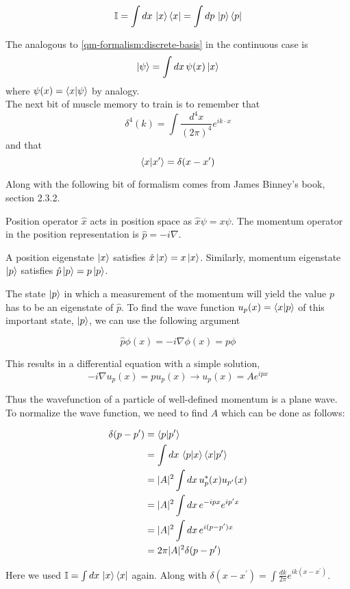 $$
\mathbb{I} = \int dx \, \ket{x} \bra{x} = \int dp \, \ket{p} \bra{p}
$$


The analogous to \ref{qm-formalism:discrete-basis} in the continuous case is
$$
\ket{\psi} = \int dx\, \psi(x) \ket{x}
$$
where $\psi (x) = \braket{x | \psi}$ by analogy.
\\


The next bit of muscle memory to train is to remember that
$$
\delta^{4} (k) = \int \frac{d^4x}{(2\pi)^4} e^{ik\cdot x}
$$
and that
$$
\braket{x | x^\prime} = \delta(x - x^\prime)
$$

Along with the following bit of formalism comes from James Binney's book, section 2.3.2.

Position operator $\hat{x}$ acts in position space as $\hat{x} \psi = x\psi$.
The momentum operator in the position representation is $\hat{p} = -i\nabla$.

A position eigenstate $\ket{x}$ satisfies $\hat{x}\ket{x} = x\ket{x}$.
Similarly, momentum eigenstate $\ket{p}$ satisfies $\hat{p}\ket{p} = p\ket{p}$.

The state $\ket{p}$ in which a measurement of the momentum will yield the value $p$ has to be an eigenstate
of $\hat{p}$.
To find the wave function $u_p (x) = \braket{x | p}$ of this important state, $\ket{p}$,
we can use the following argument

$$
\hat{p} \phi(x) = -i\nabla \phi(x) = p\phi
$$

This results in a differential equation with a simple solution,
$$
-i\nabla u_p(x) = p u_p(x) \rightarrow u_p(x) = Ae^{ipx}
$$

Thus the wavefunction of a particle of well-defined momentum is a plane wave.
To normalize the wave function, we need to find $A$ which can be done as follows:

\begin{align*}
\delta(p - p^\prime) &= \braket{p | p^\prime} \\
&= \int dx \, \braket{p | x} \braket{x | p^\prime} \\
&= |A|^2 \int dx \, u_{p}^{*} (x) u_{p^\prime} (x) \\
&= |A|^2 \int dx \, e^{-ipx} e^{ip^\prime x} \\
&= |A|^2 \int dx \, e^{i(p - p^\prime) x} \\
&= 2\pi |A|^2 \delta(p - p^\prime)
\end{align*}

Here we used $\mathbb{I} = \int dx \, \ket{x}\bra{x}$ again.
Along with $\delta(x-x^\prime) = \int \frac{dk}{2\pi} e^{ik(x-x^\prime)}$.







